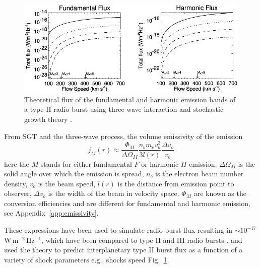 \begin{figure}[t!]
\begin{center}
\includegraphics[scale=1.1, trim=0cm 0cm 0cm 0.5cm]{images/Cairns2003.pdf}
\caption[Theoretically predicted radio burst fluxes]{Theoretical flux of the fundamental and harmonic emission bands of a type II radio burst using three wave interaction and stochastic growth theory \citet{cairns2003}.}
\label{fig:cairns_emissivity}
\end{center}
\end{figure}
From SGT and the three-wave process, the volume emissivity of the emission \citep{robinson1993a, robinson1998}
\begin{equation}
j_M(r) \approx \frac{\Phi_M}{\Delta\Omega_M}\frac{n_b m_e v_b^3}{3l(r)}\frac{\Delta v_b}{v_b}
\label{eqn:plasma_emiss}
\end{equation}
here the $M$ stands for either fundamental $F$ or harmonic $H$ emission. $\Delta\Omega_M$ is the solid angle over which the  emission is spread, $n_b$ is the electron beam number density, $v_b$ is the beam speed, $l(r)$ is the distance from emission point to observer, $\Delta v_b$ is the width of the beam in velocity space. $\Phi_M$ are known as the conversion efficiencies and are different for fundamental and harmonic emission, see Appendix~\ref{app:emissivity}.

These expressions have been used to simulate radio burst flux resulting in $\sim10^{-17}$\,W\,m$^{-2}$\,Hz$^{-1}$, which have been compared to type II and III radio bursts \citep{schmidt2012, knock2001}. \citet{knock2003} and \citet{cairns2003} used the theory to predict interplanetary type II burst flux as a function of a variety of shock parameters e.g., shocks speed Fig.~\ref{fig:cairns_emissivity}.

